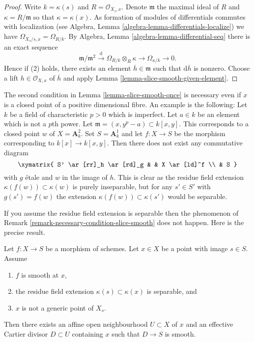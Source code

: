 \begin{proof}
Write $k = \kappa(s)$ and $R = \mathcal{O}_{X_s, x}$.
Denote $\mathfrak m$ the maximal ideal of $R$ and
$\kappa = R/\mathfrak m$ so that $\kappa = \kappa(x)$.
As formation of modules of differentials commutes with localization (see
Algebra, Lemma \ref{algebra-lemma-differentials-localize})
we have $\Omega_{X_s/s, x} = \Omega_{R/k}$. By
Algebra, Lemma \ref{algebra-lemma-differential-seq}
there is an exact sequence
$$
\mathfrak m/\mathfrak m^2 \xrightarrow{\text{d}}
\Omega_{R/k} \otimes_R \kappa \to
\Omega_{\kappa/k} \to 0.
$$
Hence if (2) holds, there exists an element $\overline{h} \in \mathfrak m$
such that $\text{d}\overline{h}$ is nonzero. Choose a lift
$h \in \mathcal{O}_{X, x}$ of $\overline{h}$ and apply
Lemma \ref{lemma-slice-smooth-given-element}.
\end{proof}

\begin{remark}
\label{remark-necessary-condition-slice-smooth}
The second condition in
Lemma \ref{lemma-slice-smooth-once}
is necessary even if $x$ is a closed point of a positive
dimensional fibre. An example is the following: Let $k$ be a field
of characteristic $p > 0$ which is imperfect. Let $a \in k$ be an
element which is not a $p$th power. Let
$\mathfrak m = (x, y^p - a) \subset k[x, y]$. This corresponds to a closed
point $w$ of $X = \mathbf{A}^2_k$. Set $S = \mathbf{A}^1_k$ and
let $f : X \to S$ be the morphism corresponding to $k[x] \to k[x, y]$.
Then there does not exist any commutative diagram
$$
\xymatrix{
S' \ar[rr]_h \ar[rd]_g & & X \ar[ld]^f \\
& S
}
$$
with $g$ \'etale and $w$ in the image of $h$. This is clear as the residue
field extension $\kappa(f(w)) \subset \kappa(w)$ is purely inseparable,
but for any $s' \in S'$ with $g(s') = f(w)$ the extension
$\kappa(f(w)) \subset \kappa(s')$ would be separable.
\end{remark}

\noindent
If you assume the residue field extension is separable then the
phenomenon of
Remark \ref{remark-necessary-condition-slice-smooth}
does not happen. Here is the precise result.

\begin{lemma}
\label{lemma-slice-smooth-once-separable-residue-field-extension}
Let $f : X \to S$ be a morphism of schemes.
Let $x \in X$ be a point with image $s \in S$.
Assume
\begin{enumerate}
\item $f$ is smooth at $x$,
\item the residue field extension $\kappa(s) \subset \kappa(x)$
is separable, and
\item $x$ is not a generic point of $X_s$.
\end{enumerate}
Then there exists an affine open neighbourhood $U \subset X$ of $x$
and an effective Cartier divisor $D \subset U$ containing $x$ such that
$D \to S$ is smooth.
\end{lemma}

